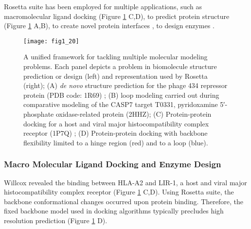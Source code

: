 \begin{refsection}
Rosetta suite has been employed for multiple applications, such as
macromolecular ligand docking \cite{Willcox2003} (Figure
\ref{fig:rosetta-overview} C,D), to predict protein structure \cite{Rohl2004}
(Figure \ref{fig:rosetta-overview} A,B), to create novel protein interfaces
\cite{Jiang2008,Hennig2002} , to design enzymes \cite{Ashworth2006a}.
\begin{figure}[p] \centering \texttt{[image: fig1\_20]}
    \caption[A unified framework for tackling multiple molecular modeling
        problems. Each panel depicts a problem in biomolecule structure
        prediction or design (left) and the representation used by Rosetta
        (right); (A) \emph{de novo} structure prediction for the phage 434
        repressor protein (PDB code: 1R69); (B) loop modeling carried out
        during comparative modeling of the CASP7 target T0331, pyridoxamine
        5′-phosphate oxidase-related protein (2HHZ); (C) Protein-protein
        docking for a host and viral major histocompatibility complex receptor
        (1P7Q); (D) Protein-protein docking with backbone flexibility limited
        to a hinge region (red) and to a loop (blue).] {A unified framework for
            tackling multiple molecular modeling problems. Each panel depicts a
            problem in biomolecule structure prediction or design (left) and
            representation used by Rosetta (right); (A) \emph{de novo}
            structure prediction for the phage 434 repressor protein (PDB code:
            1R69) \cite{Mondragon1989}; (B) loop modeling carried out during
            comparative modeling of the CASP7 target T0331, pyridoxamine
            5′-phosphate oxidase-related protein (2HHZ); (C) Protein-protein
            docking for a host and viral major histocompatibility complex
            receptor (1P7Q) \cite{Willcox2003}; (D) Protein-protein docking
            with backbone flexibility limited to a hinge region (red) and to a
            loop (blue)\cite{Das2008}.}
        \label{fig:rosetta-overview} 
\end{figure}

\subsubsection{Macro Molecular Ligand Docking and Enzyme Design}

Willcox  revealed the binding between HLA-A2 and LIR-1, a host
and viral major histocompatibility complex receptor \cite{Willcox2003} (Figure
\ref{fig:rosetta-overview} C,D). Using Rosetta suite, the backbone
conformational changes occurred upon protein binding. Therefore, the fixed
backbone model used in docking algorithms typically precludes high resolution
prediction (Figure \ref{fig:rosetta-overview} D).


\end{refsection}
